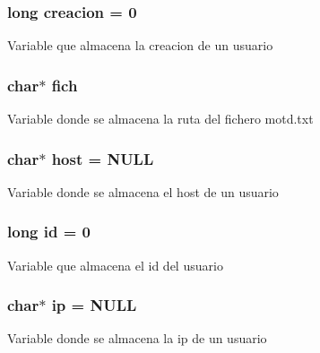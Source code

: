 \subsubsection[{\texorpdfstring{creacion}{creacion}}]{\setlength{\rightskip}{0pt plus 5cm}long creacion = 0}\hypertarget{_g-2361-06-_p1-_server_8c_a26292066ca0d17922eadee4161542ab9}{}\label{_g-2361-06-_p1-_server_8c_a26292066ca0d17922eadee4161542ab9}
Variable que almacena la creacion de un usuario 
\subsubsection[{\texorpdfstring{fich}{fich}}]{\setlength{\rightskip}{0pt plus 5cm}char$\ast$ fich}\hypertarget{_g-2361-06-_p1-_server_8c_a5666511ca3d4a3dc685c6f14c663aed5}{}\label{_g-2361-06-_p1-_server_8c_a5666511ca3d4a3dc685c6f14c663aed5}
Variable donde se almacena la ruta del fichero motd.\+txt 
\subsubsection[{\texorpdfstring{host}{host}}]{\setlength{\rightskip}{0pt plus 5cm}char$\ast$ host = N\+U\+LL}\hypertarget{_g-2361-06-_p1-_server_8c_a1c2046dcb30a629d6d9f45ff8f403f12}{}\label{_g-2361-06-_p1-_server_8c_a1c2046dcb30a629d6d9f45ff8f403f12}
Variable donde se almacena el host de un usuario 
\subsubsection[{\texorpdfstring{id}{id}}]{\setlength{\rightskip}{0pt plus 5cm}long id = 0}\hypertarget{_g-2361-06-_p1-_server_8c_a7350fbd6ad10618f3b750b1f99ca5c3c}{}\label{_g-2361-06-_p1-_server_8c_a7350fbd6ad10618f3b750b1f99ca5c3c}
Variable que almacena el id del usuario 
\subsubsection[{\texorpdfstring{ip}{ip}}]{\setlength{\rightskip}{0pt plus 5cm}char$\ast$ ip = N\+U\+LL}\hypertarget{_g-2361-06-_p1-_server_8c_afbc356cd0e25d1dbbece7c10fd025fa6}{}\label{_g-2361-06-_p1-_server_8c_afbc356cd0e25d1dbbece7c10fd025fa6}
Variable donde se almacena la ip de un usuario 

